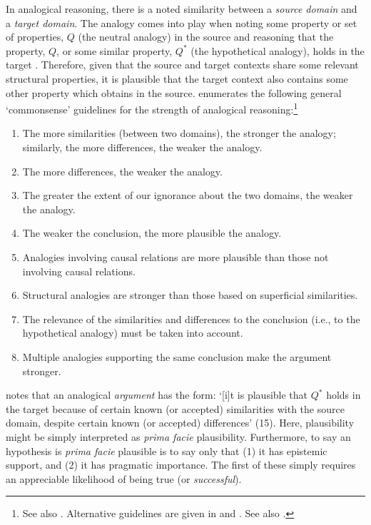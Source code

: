 \documentclass{amsart}
\theoremstyle{indented}
\theoremstyle{indentedProp}
\theoremstyle{indented}
\theoremstyle{indented}
\theoremstyle{indented}
\theoremstyle{indented}
\theoremstyle{indented}
\begin{document}
In analogical reasoning, there is a noted similarity between a {\it source domain} and a {\it target domain}. The analogy comes into play when noting some property or set of properties, $Q$ (the neutral analogy) in the source and reasoning that the property, $Q$, or some similar property, $Q^{*}$ (the hypothetical analogy), holds in the target \citep{Keynes-1921}. Therefore, given that the source and target contexts share some relevant structural properties, it is plausible that the target context also contains some other property which obtains in the source. \citet{sep-reasoning-analogy} enumerates the following general `commonsense' guidelines for the strength of analogical reasoning:\footnote{See also \citet{Mill-1843, Keynes-1921, Robinson-1930, Stebbing-1933, Moore-Parker-1998, Woods-Irvine-Walton-2004, Copi-Cohen-2005}. Alternative guidelines are given in \citet{Aristotle-Prior-Analytics, Aristotle-Rhetoric, Aristotle-Topics} and \citet{Hesse-1966}. See also \citet{Hume-1779, Quine-Ullian-1970}.}
\begin{enumerate}
    \item The more similarities (between two domains), the stronger the analogy; similarly, the more differences, the weaker the analogy.
    \item The more differences, the weaker the analogy.
    \item The greater the extent of our ignorance about the two domains, the weaker the analogy.
    \item The weaker the conclusion, the more plausible the analogy.
    \item Analogies involving causal relations are more plausible than those not involving causal relations.
    \item Structural analogies are stronger than those based on superficial similarities.
    \item The relevance of the similarities and differences to the conclusion (i.e., to the hypothetical analogy) must be taken into account.
    \item Multiple analogies supporting the same conclusion make the argument stronger.
\end{enumerate}

\citet{Bartha-2010} notes that an analogical {\it argument} has the form: `[i]t is plausible that $Q^*$ holds in the target because of certain known (or accepted) similarities with the source domain, despite certain known (or accepted) differences' (15). Here, plausibility might be simply interpreted as {\it prima facie} plausibility. Furthermore, to say an hypothesis is {\it prima facie} plausible is to say only that (1) it has epistemic support, and (2) it has pragmatic importance. The first of these simply requires an appreciable likelihood of being true (or {\it successful}).
\end{document}
